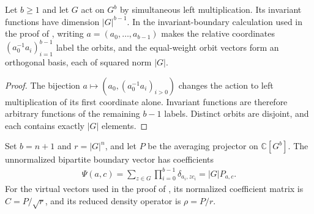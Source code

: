 \begin{lemma}%
    \label{thm:peps_regular_boundary_invariants}
    \leanok
    Let $b\geq1$ and let $G$ act on $G^b$ by simultaneous left
    multiplication. Its invariant functions have dimension $|G|^{b-1}$.
    In the invariant-boundary calculation used in the proof of
    \cite[Theorem~6.9]{Schuch2010PEPS}, writing $a=(a_0,\ldots,a_{b-1})$ makes the relative coordinates
    $(a_0^{-1}a_i)_{i=1}^{b-1}$ label the orbits, and the equal-weight orbit
    vectors form an orthogonal basis, each of squared norm $|G|$.
\end{lemma}
\begin{proof}\leanok
    The bijection $a\mapsto(a_0,(a_0^{-1}a_i)_{i>0})$ changes the action to
    left multiplication of its first coordinate alone. Invariant functions
    are therefore arbitrary functions of the remaining $b-1$ labels.
    Distinct orbits are disjoint, and each contains exactly $|G|$ elements.
\end{proof}

\begin{definition}%
    \label{def:peps_regular_boundary_state}
    \leanok
    Set $b=n+1$ and $r=|G|^n$, and let $P$ be the averaging projector
    on $\mathbb C[G^b]$. The unnormalized bipartite boundary vector has
    coefficients
    \begin{align}
        \Psi(a,c)=\sum_{z\in G}\prod_{i=0}^{b-1}\delta_{a_i,zc_i}
        =|G|P_{a,c}.
    \end{align}
    For the virtual vectors used
    in the proof of \cite[Theorem~6.9]{Schuch2010PEPS}, its normalized coefficient matrix is $C=P/\sqrt r$, and its reduced
    density operator is $\rho=P/r$.
\end{definition}

